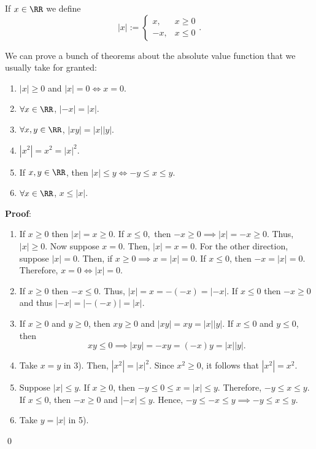\begin{definition}
If $x\in \RR$ we define
\[
|x| := \begin{cases}
x, &x\geq 0 \\
-x, &x\leq 0
\end{cases}.
\]
\end{definition}
\begin{theorem}
We can prove a bunch of theorems about the absolute value function that we usually take for granted:
\begin{enumerate}[label = \arabic*)]
    \item $|x|\geq 0$ and $|x| = 0 \iff x = 0$.
    \item $\forall x\in \RR$, $|-x| = |x|$.
    \item $\forall x,y\in \RR$, $|xy| = |x||y|$.
    \item $|x^2| = x^2 = |x|^2$.
    \item If $x,y\in \RR$, then $|x|\leq y \iff -y\leq x \leq y$.
    \item $\forall x\in \RR$, $x\leq |x|$.
\end{enumerate}
\end{theorem}
\textbf{Proof}: 
\begin{enumerate}[label = \arabic*)]
    \item If $x\geq 0$ then $|x| = x \geq 0$. If $x\leq 0,$ then $-x\geq 0 \implies |x| = -x\geq 0$. Thus, $|x|\geq 0$. Now suppose $x = 0$. Then, $|x| = x = 0$. For the other direction, suppose $|x| = 0$. Then, if $x\geq 0\implies x = |x| = 0$. If $x\leq 0$, then $-x = |x| = 0$. Therefore, $x=0\iff |x| = 0$.
    
    \item If $x\geq 0$ then $-x \leq 0$. Thus, $|x| = x = -(-x) = |-x|$. If $x\leq 0$ then $-x\geq 0$ and thus $|-x| = |-(-x)| = |x|$.
    \item If $x\geq 0$ and $y\geq 0$, then $xy \geq 0$ and $|xy| = xy = |x||y|$. If $x\leq 0$ and $y\leq 0$, then \[xy\leq 0 \implies |xy| = -xy = (-x)y = |x||y|.\]
    
    \item Take $x=y$ in 3). Then, $|x^2| = |x|^2$. Since $x^2 \geq 0$, it follows that $|x^2| = x^2$.
    
    \item Suppose $|x|\leq y$. If $x\geq 0$, then $-y\leq 0\leq x = |x| \leq y$. Therefore, $-y\leq x \leq y$. If $x\leq 0$, then $-x\geq 0$ and $|-x|\leq y$. Hence, $-y \leq -x\leq y \implies -y\leq x \leq y$.
    
    \item Take $y = |x|$ in 5).
\end{enumerate}
\qed 

